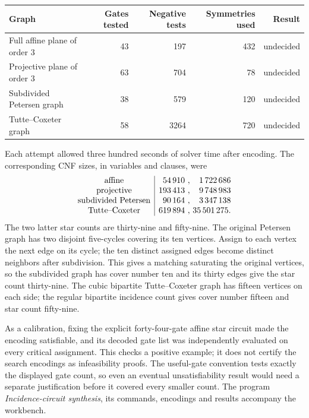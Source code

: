 \begin{center}
\small
\begin{tabular}{@{}lrrrr@{}}
\toprule
Graph & Gates tested & Negative tests & Symmetries used & Result\\\midrule
Full affine plane of order $3$ &43&197&432&undecided\\
Projective plane of order $3$ &63&704&78&undecided\\
Subdivided Petersen graph &38&579&120&undecided\\
Tutte--Coxeter graph &58&3264&720&undecided\\
\bottomrule
\end{tabular}
\end{center}
Each attempt allowed three hundred seconds of solver time after encoding. The corresponding CNF sizes, in variables and clauses, were
\[
\begin{array}{c|r@{\ ,\ }r}
\text{affine}&54\,910&1\,722\,686\\
\text{projective}&193\,413&9\,748\,983\\
\text{subdivided Petersen}&90\,164&3\,347\,138\\
\text{Tutte--Coxeter}&619\,894&35\,501\,275.
\end{array}
\]
The two latter star counts are thirty-nine and fifty-nine. The original Petersen graph has two disjoint five-cycles covering its ten vertices. Assign to each vertex the next edge on its cycle; the ten distinct assigned edges become distinct neighbors after subdivision. This gives a matching saturating the original vertices, so the subdivided graph has cover number ten and its thirty edges give the star count thirty-nine. The cubic bipartite Tutte--Coxeter graph has fifteen vertices on each side; the regular bipartite incidence count gives cover number fifteen and star count fifty-nine.

As a calibration, fixing the explicit forty-four-gate affine star circuit made the encoding satisfiable, and its decoded gate list was independently evaluated on every critical assignment. This checks a positive example; it does not certify the search encodings as infeasibility proofs. The useful-gate convention tests exactly the displayed gate count, so even an eventual unsatisfiability result would need a separate justification before it covered every smaller count. The program \emph{Incidence-circuit synthesis}, its commands, encodings and results accompany the workbench.

